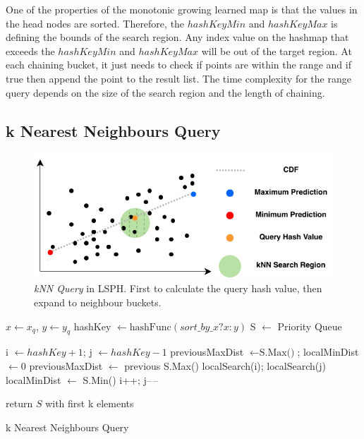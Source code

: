 One of the properties of the monotonic growing learned map is that the values in the head nodes are sorted. Therefore, the $hashKeyMin$ and $hashKeyMax$ is defining the bounds of the search region. Any index value on the hashmap that exceeds the $hashKeyMin$ and $hashKeyMax$ will be out of the target region. At each chaining bucket, it just needs to check if points are within the range and if true then append the point to the result list. The time complexity for the range query depends on the size of the search region and the length of chaining.  



\subsection{k Nearest Neighbours Query}

\begin{figure}[ht]
\centering
\includegraphics{Figures/knn.pdf}
\caption{\textit{kNN Query} in LSPH. First to calculate the query hash value, then expand to neighbour buckets.}
\label{fig:knn}
\end{figure}



\begin{algorithm}[H] \label{knn_query}
\SetAlgoLined
{}
$x\leftarrow{x_q}$, $y\leftarrow{y_q}$\;
hashKey $\leftarrow{\text{hashFunc}(sort\_by\_x ? x : y)}$\;
S $\leftarrow$ Priority Queue\;




i $\leftarrow{hashKey+1}$; 
j $\leftarrow{hashKey-1}$\; 
previousMaxDist $\leftarrow{\text{S.Max()}}$;
localMinDist $\leftarrow{0}$\;
 {
    previousMaxDist $\leftarrow$ previous S.Max()\;
    localSearch(i); localSearch(j)\;
    localMinDist $\leftarrow$ S.Min()\;
    i++; j--\,--\;
 }
 
 
 return $S$ with first k elements\;
 \caption{k Nearest Neighbours Query}
\end{algorithm}

